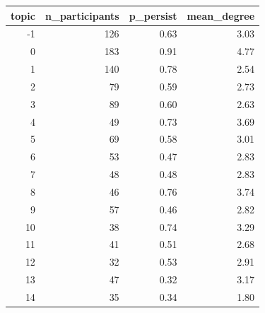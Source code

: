 \begin{tabular}{rrrr}
\toprule
topic & n_participants & p_persist & mean_degree \\
\midrule
-1 & 126 & 0.63 & 3.03 \\
0 & 183 & 0.91 & 4.77 \\
1 & 140 & 0.78 & 2.54 \\
2 & 79 & 0.59 & 2.73 \\
3 & 89 & 0.60 & 2.63 \\
4 & 49 & 0.73 & 3.69 \\
5 & 69 & 0.58 & 3.01 \\
6 & 53 & 0.47 & 2.83 \\
7 & 48 & 0.48 & 2.83 \\
8 & 46 & 0.76 & 3.74 \\
9 & 57 & 0.46 & 2.82 \\
10 & 38 & 0.74 & 3.29 \\
11 & 41 & 0.51 & 2.68 \\
12 & 32 & 0.53 & 2.91 \\
13 & 47 & 0.32 & 3.17 \\
14 & 35 & 0.34 & 1.80 \\
\bottomrule
\end{tabular}
